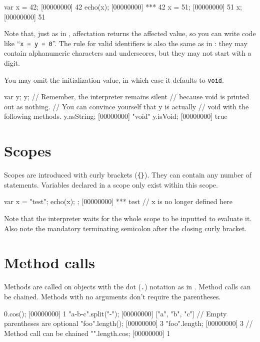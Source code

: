 \begin{urbiscript}[firstnumber=last]
var x = 42;
[00000000] 42
echo(x);
[00000000] *** 42
x = 51;
[00000000] 51
x;
[00000000] 51
\end{urbiscript}

Note that, just as in \Cxx, affectation returns the affected value, so
you can write code like ``\lstinline|x = y = 0|''. The rule for valid
identifiers is also the same as in \Cxx: they may contain alphanumeric
characters and underscores, but they may not start with a digit.

You may omit the initialization value, in which case it defaults to
\lstinline|void|.

\begin{urbiscript}[firstnumber=last]
var y;
y;
// Remember, the interpreter remains silent
// because void is printed out as nothing.
// You can convince yourself that y is actually
// void with the following methods.
y.asString;
[00000000] "void"
y.isVoid;
[00000000] true
\end{urbiscript}

\section{Scopes}
Scopes are introduced with curly brackets (\lstinline|{}|).  They can
contain any number of statements. Variables declared in a scope only
exist within this scope.

\begin{urbiscript}[firstnumber=last]
{
  var x = "test";
  echo(x);
};
[00000000] *** test
// x is no longer defined here
\end{urbiscript}

Note that the interpreter waits for the whole scope to be inputted to
evaluate it. Also note the mandatory terminating semicolon after the
closing curly bracket.

\section{Method calls}

Methods are called on objects with the dot (\lstinline{.}) notation as in
\Cxx. Method calls can be chained. Methods with no arguments don't
require the parentheses.

\begin{urbiscript}[firstnumber=last]
0.cos();
[00000000] 1
"a-b-c".split("-");
[00000000] ["a", "b", "c"]
// Empty parentheses are optional
"foo".length();
[00000000] 3
"foo".length;
[00000000] 3
// Method call can be chained
"".length.cos;
[00000000] 1
\end{urbiscript}

